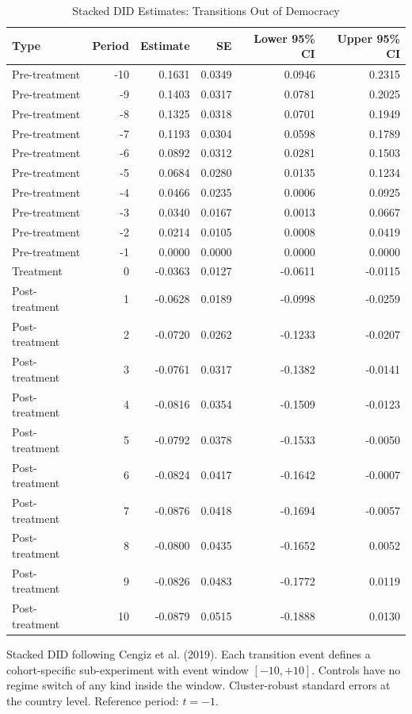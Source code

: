 \begin{table}[H]
\centering
\caption{\label{tab:stacked-out-table}Stacked DID Estimates: Transitions Out of Democracy}
\centering
\fontsize{9}{11}\selectfont
\begin{threeparttable}
\begin{tabular}[t]{lrrrrr}
\toprule
Type & Period & Estimate & SE & Lower 95\% CI & Upper 95\% CI\\
\midrule
Pre-treatment & -10 & 0.1631 & 0.0349 & 0.0946 & 0.2315\\
Pre-treatment & -9 & 0.1403 & 0.0317 & 0.0781 & 0.2025\\
Pre-treatment & -8 & 0.1325 & 0.0318 & 0.0701 & 0.1949\\
Pre-treatment & -7 & 0.1193 & 0.0304 & 0.0598 & 0.1789\\
Pre-treatment & -6 & 0.0892 & 0.0312 & 0.0281 & 0.1503\\
\addlinespace
Pre-treatment & -5 & 0.0684 & 0.0280 & 0.0135 & 0.1234\\
Pre-treatment & -4 & 0.0466 & 0.0235 & 0.0006 & 0.0925\\
Pre-treatment & -3 & 0.0340 & 0.0167 & 0.0013 & 0.0667\\
Pre-treatment & -2 & 0.0214 & 0.0105 & 0.0008 & 0.0419\\
Pre-treatment & -1 & 0.0000 & 0.0000 & 0.0000 & 0.0000\\
\addlinespace
Treatment & 0 & -0.0363 & 0.0127 & -0.0611 & -0.0115\\
Post-treatment & 1 & -0.0628 & 0.0189 & -0.0998 & -0.0259\\
Post-treatment & 2 & -0.0720 & 0.0262 & -0.1233 & -0.0207\\
Post-treatment & 3 & -0.0761 & 0.0317 & -0.1382 & -0.0141\\
Post-treatment & 4 & -0.0816 & 0.0354 & -0.1509 & -0.0123\\
\addlinespace
Post-treatment & 5 & -0.0792 & 0.0378 & -0.1533 & -0.0050\\
Post-treatment & 6 & -0.0824 & 0.0417 & -0.1642 & -0.0007\\
Post-treatment & 7 & -0.0876 & 0.0418 & -0.1694 & -0.0057\\
Post-treatment & 8 & -0.0800 & 0.0435 & -0.1652 & 0.0052\\
Post-treatment & 9 & -0.0826 & 0.0483 & -0.1772 & 0.0119\\
\addlinespace
Post-treatment & 10 & -0.0879 & 0.0515 & -0.1888 & 0.0130\\
\bottomrule
\end{tabular}
\begin{tablenotes}
\item Stacked DID following Cengiz et al. (2019). Each transition event defines a cohort-specific sub-experiment with event window $[-10, +10]$. Controls have no regime switch of any kind inside the window. Cluster-robust standard errors at the country level. Reference period: $t = -1$.
\end{tablenotes}
\end{threeparttable}
\end{table}
